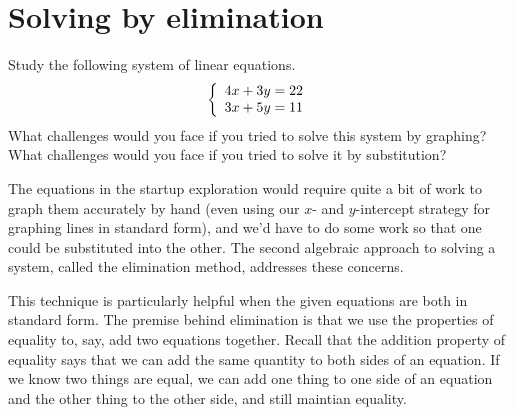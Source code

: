 %
%
%

\section{Solving by elimination}
\label{sec:syselimination}

\begin{boxedexplore}
Study the following system of linear equations.
\[\left\{\begin{array}{l}4x+3y=22\\3x+5y=11\end{array}\right.\]
What challenges would you face if you tried to solve this system by graphing? What challenges would you face if you tried to solve it by substitution?
\end{boxedexplore}

The equations in the startup exploration would require quite a bit of work to graph them accurately by hand (even using our $x$- and $y$-intercept strategy for graphing lines in standard form), and we'd have to do some work so that one could be substituted into the other. The second algebraic approach to solving a system, called the \gls{elimination method}, addresses these concerns.

This technique is particularly helpful when the given equations are both in standard form. The premise behind elimination is that we use the properties of equality to, say, add two equations together. Recall that the addition property of equality says that we can add the same quantity to both sides of an equation. If we know two things are equal, we can add one thing to one side of an equation and the other thing to the other side, and still maintian equality.

